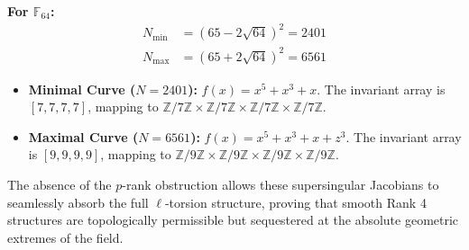 \documentclass[letterpaper, 11pt]{article}
\begin{document}
\textbf{For $\mathbb{F}_{64}$:}
\begin{align*}
    N_{\text{min}} &= (65 - 2\sqrt{64})^2 = 2401 \\
    N_{\text{max}} &= (65 + 2\sqrt{64})^2 = 6561
\end{align*}
\begin{itemize}
    \item \textbf{Minimal Curve ($N=2401$):} $f(x) = x^5 + x^3 + x$. The invariant array is $[7, 7, 7, 7]$, mapping to $\mathbb{Z}/7\mathbb{Z} \times \mathbb{Z}/7\mathbb{Z} \times \mathbb{Z}/7\mathbb{Z} \times \mathbb{Z}/7\mathbb{Z}$.
    \item \textbf{Maximal Curve ($N=6561$):} $f(x) = x^5 + x^3 + x + z^3$. The invariant array is $[9, 9, 9, 9]$, mapping to $\mathbb{Z}/9\mathbb{Z} \times \mathbb{Z}/9\mathbb{Z} \times \mathbb{Z}/9\mathbb{Z} \times \mathbb{Z}/9\mathbb{Z}$.
\end{itemize}

The absence of the $p$-rank obstruction allows these supersingular Jacobians to seamlessly absorb the full $\ell$-torsion structure, proving that smooth Rank 4 structures are topologically permissible but sequestered at the absolute geometric extremes of the field.
\end{document}

